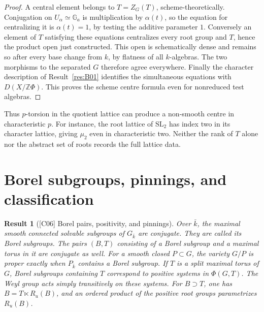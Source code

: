 \documentclass[11pt,a4paper,openany,oneside]{book}
\theoremstyle{resultstyle}
\newtheorem{statement}{Result}[chapter]
\newenvironment{result}[2]{\clubpenalty=10000\begin{statement}[\textnormal{[#1]} #2]\leavevmode\label{res:#1}\ignorespaces}{\end{statement}}
\theoremstyle{definition}
\numberwithin{equation}{chapter}
\newcommand{\Ga}{\mathbb{G}_a}
\newcommand{\SL}{\mathrm{SL}}
\newcommand{\ZZ}{\mathbb{Z}}
\begin{document}
\begin{proof}
A central element belongs to \(T=Z_G(T)\), scheme-theoretically.
Conjugation on \(U_\alpha\simeq\Ga\) is multiplication by
\(\alpha(t)\), so the equation for centralizing it is
\(\alpha(t)=1\), by testing the additive parameter \(1\).
Conversely an element of \(T\) satisfying these equations
centralizes every root group and \(T\), hence the product
open just constructed. This open is schematically dense
and remains so after every base change from \(k\), by flatness
of all \(k\)-algebras. The two morphisms to the separated
\(G\) therefore agree everywhere. Finally the character
description of Result~\ref{res:B01} identifies the simultaneous
equations with \(D(X/\ZZ\Phi)\). This proves the scheme
centre formula even for nonreduced test algebras.
\end{proof}

Thus \(p\)-torsion in the quotient lattice can produce a non-smooth centre in characteristic \(p\). For instance, the root lattice of \(\SL_2\) has index two in its character lattice, giving \(\mu_2\) even in characteristic two. Neither the rank of \(T\) alone nor the abstract set of roots records the full lattice data.

\section{Borel subgroups, pinnings, and classification}

\begin{result}{C06}{Borel pairs, positivity, and pinnings}
Over \(\bar k\), the maximal smooth connected solvable subgroups of \(G_{\bar k}\) are conjugate. They are called its Borel subgroups. The pairs \((B,T)\) consisting of a Borel subgroup and a maximal torus in it are conjugate as well. For a smooth closed \(P\subset G\), the variety \(G/P\) is proper exactly when \(P_{\bar k}\) contains a Borel subgroup. If \(T\) is a split maximal torus of \(G\), Borel subgroups containing \(T\) correspond to positive systems in \(\Phi(G,T)\). The Weyl group acts simply transitively on these systems. For \(B\supset T\), one has \(B=T\ltimes R_u(B)\), and an ordered product of the positive root groups parametrizes \(R_u(B)\).
\end{result}
\end{document}
